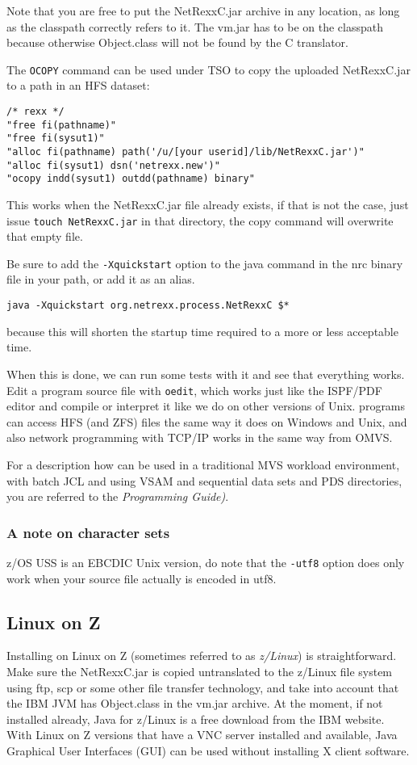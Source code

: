 Note that you are free to put the NetRexxC.jar archive in any
location, as long as the classpath correctly refers to it. The vm.jar
has to be on the classpath because otherwise Object.class will not be
found by the \nr{}C translator.

The \texttt{OCOPY} command can be used under TSO to copy the uploaded
NetRexxC.jar to a path in an HFS dataset:
\begin{lstlisting}
/* rexx */                                             
"free fi(pathname)"                                    
"free fi(sysut1)"                                      
"alloc fi(pathname) path('/u/[your userid]/lib/NetRexxC.jar')"
"alloc fi(sysut1) dsn('netrexx.new')"                  
"ocopy indd(sysut1) outdd(pathname) binary"            
\end{lstlisting}
This works when the NetRexxC.jar file already exists, if that is not the
case, just issue \texttt{touch NetRexxC.jar} in that directory, the
copy command will overwrite that empty file.

Be sure to add the \texttt{-Xquickstart} option to the java command in
the nrc binary file in your path, or add it as an alias.
\begin{lstlisting}
java -Xquickstart org.netrexx.process.NetRexxC $*
\end{lstlisting}
because this will shorten the startup time required to a more or less
acceptable time.

When this is done, we can run some tests with it and see that
everything works. Edit a program source file with \texttt{oedit},
which works just like the ISPF/PDF editor and compile or interpret it
like we do on other versions of Unix. \nr{} programs can access HFS (and
ZFS) files the same way it does on Windows and Unix, and also network
programming with TCP/IP works in the same way from OMVS.

For a description how \nr{} can be used in a traditional MVS
workload environment, with batch JCL and using VSAM and sequential
data sets and PDS directories, you are referred to the \emph{\nr{}
  Programming Guide)}.
\subsubsection{A note on character sets}
z/OS USS is an EBCDIC Unix version, do note that the \texttt{-utf8}
option does only work when your source file actually is encoded in
utf8.
\subsection{Linux on Z}
Installing on Linux on Z (sometimes referred to as \emph{z/Linux}) is straightforward. Make sure the NetRexxC.jar
is copied untranslated to the z/Linux file system using ftp, scp or
some other file transfer technology, and take into
account that the IBM JVM has Object.class in the vm.jar archive. At
the moment, if not installed already, Java for z/Linux is a free download from the IBM website. With
Linux on Z versions that have a VNC server installed and available, Java
Graphical User Interfaces (GUI) can be used without installing X client software. 
